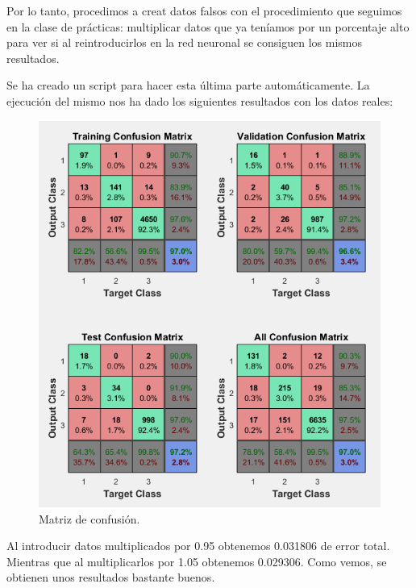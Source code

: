 \documentclass[a4paper,12pt,titlepage]{article}
\begin{document}
Por lo tanto, procedimos a creat datos falsos con el procedimiento que seguimos en la clase de prácticas: 
multiplicar datos que ya teníamos por un porcentaje alto para ver si al reintroducirlos en la red neuronal se consiguen los mismos resultados.

Se ha creado un script para hacer esta última parte automáticamente. La ejecución del mismo nos ha dado los siguientes resultados con los datos reales:

\newpage

\begin{figure}[!ht]
	\centering
	\label{fig:ConfMatrix}
	\includegraphics[width=\textwidth]{ConfMatrix.png}
	\caption{Matriz de confusión.}
\end{figure}

Al introducir datos multiplicados por 0.95 obtenemos 0.031806 de error total. Mientras que al multiplicarlos por 1.05 obtenemos 0.029306. Como vemos, se obtienen unos resultados bastante buenos.



\newpage


\end{document}
